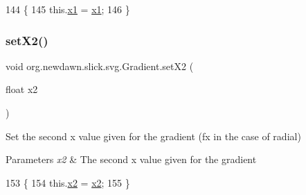 \begin{DoxyCode}
144                                 \{
145         this.\mbox{\hyperlink{classorg_1_1newdawn_1_1slick_1_1svg_1_1_gradient_a3cd592974e65659efb2ae92a73420938}{x1}} = \mbox{\hyperlink{classorg_1_1newdawn_1_1slick_1_1svg_1_1_gradient_a3cd592974e65659efb2ae92a73420938}{x1}};
146     \}
\end{DoxyCode}
\mbox{\label{classorg_1_1newdawn_1_1slick_1_1svg_1_1_gradient_a1f8a0aabd30611675c18617c11579e1f}} 
\subsubsection{\texorpdfstring{set\+X2()}{setX2()}}
{\footnotesize\ttfamily void org.\+newdawn.\+slick.\+svg.\+Gradient.\+set\+X2 (\begin{DoxyParamCaption}\item[{float}]{x2 }\end{DoxyParamCaption})\hspace{0.3cm}{\ttfamily [inline]}}

Set the second x value given for the gradient (fx in the case of radial)


\begin{DoxyParams}{Parameters}
{\em x2} & The second x value given for the gradient \\
\hline
\end{DoxyParams}

\begin{DoxyCode}
153                                 \{
154         this.\mbox{\hyperlink{classorg_1_1newdawn_1_1slick_1_1svg_1_1_gradient_ab71f7951495ddd6c4394e05f038d7487}{x2}} = \mbox{\hyperlink{classorg_1_1newdawn_1_1slick_1_1svg_1_1_gradient_ab71f7951495ddd6c4394e05f038d7487}{x2}};
155     \}
\end{DoxyCode}
\mbox{\label{classorg_1_1newdawn_1_1slick_1_1svg_1_1_gradient_a9f9ab41b4b842e33b86476d901f71075}} 
